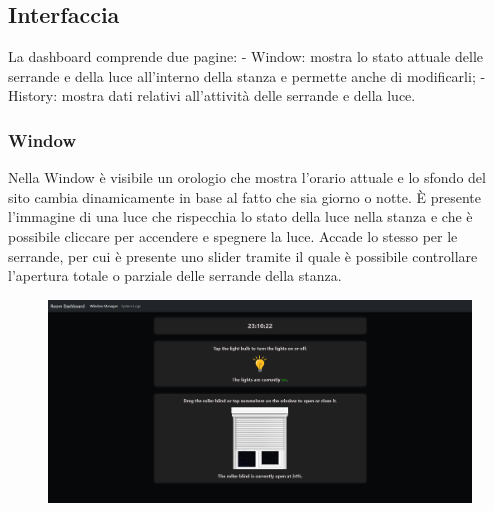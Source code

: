 \documentclass[12pt]{article}
\begin{document}
\subsection{Interfaccia}
La dashboard comprende due pagine:
\newline
- Window: mostra lo stato attuale delle serrande e della luce all'interno della stanza e permette anche di modificarli;
\newline
- History: mostra dati relativi all'attività delle serrande e della luce.

\subsubsection{Window}
Nella Window è visibile un orologio che mostra l'orario attuale e lo sfondo del sito cambia dinamicamente in base al fatto che sia giorno o notte. È presente l'immagine di una luce che rispecchia lo stato della luce nella stanza e che è possibile cliccare per accendere e spegnere la luce. Accade lo stesso per le serrande, per cui è presente uno slider tramite il quale è possibile controllare l'apertura totale o parziale delle serrande della stanza.\\
\begin{figure}[H]
    \includegraphics[width=17cm]{dashboard-window.png}
\end{figure}
\end{document}
